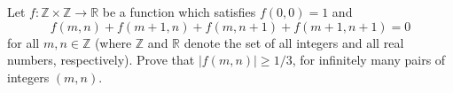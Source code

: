 Let $f : \mathbb{Z} \times \mathbb{Z} \to \mathbb{R}$ be a function which
satisfies $f(0, 0) = 1$ and
$$ f(m, n) + f(m + 1, n) + f(m, n + 1) + f(m + 1, n + 1) = 0 $$
for all $m, n \in \mathbb{Z}$ (where $\mathbb{Z}$ and $\mathbb{R}$ denote the
set of all integers and all real numbers, respectively). Prove that $|f(m, n)|
\ge 1/3$, for infinitely many pairs of integers $(m, n)$.
